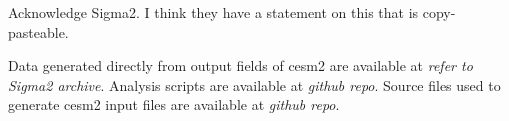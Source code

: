 \documentclass{ametsocV6.1}
\begin{document}
Acknowledge Sigma2. I think they have a statement on this that is copy-pasteable.

%
%
\datastatement{}

Data generated directly from output fields of \gls{cesm2} are available at \emph{refer
  to Sigma2 archive}. Analysis scripts are available at \emph{github repo}. Source files
used to generate \gls{cesm2} input files are available at \emph{github repo}.

%






%


\end{document}
